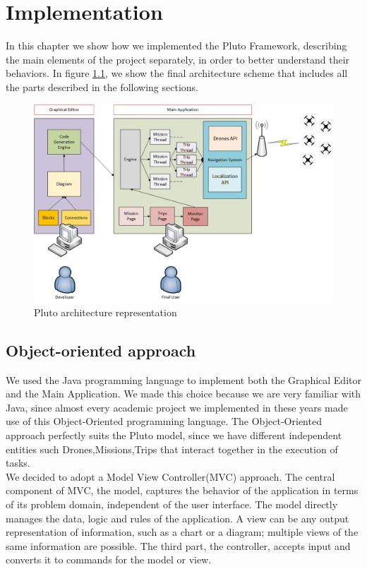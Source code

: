 \chapter{Implementation}
\label{cap5}

In this chapter we show how we implemented the Pluto Framework, describing the main elements of the project separately, in order to better understand their behaviors.
In figure \ref{fig:finalArchitecture}, we show the final architecture scheme that includes all the parts described in the following sections.
\\

\begin{figure}[h!]
\includegraphics[width=\linewidth]
{pictures/Final_Architecture.png}
\caption{Pluto architecture representation}
\label{fig:finalArchitecture}
\end{figure}

\section{Object-oriented approach}\label{oomodel}

We used the Java programming language to implement both the Graphical Editor and the Main Application.
We made this choice because we are very familiar with Java, since almost every academic project we implemented in these years made use of this Object-Oriented programming language.
The Object-Oriented approach perfectly suits the Pluto model, since we have different independent entities such Drones,Missions,Trips that interact together in the execution of tasks.
\\

We decided to adopt a Model View Controller(MVC) approach.
The central component of MVC, the model, captures the behavior of the application in terms of its problem domain, independent of the user interface.
The model directly manages the data, logic and rules of the application.
A view can be any output representation of information, such as a chart or a diagram; multiple views of the same information are possible.
The third part, the controller, accepts input and converts it to commands for the model or view.
\\

